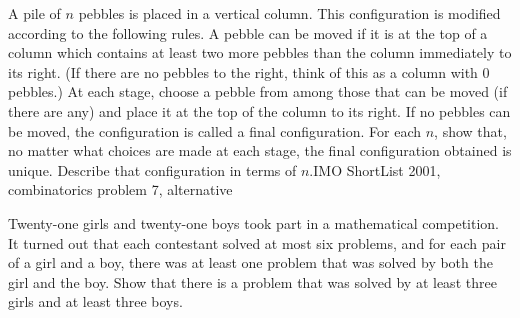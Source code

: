 \item[\textbf{C7.}]A pile of $n$ pebbles is placed in a vertical column. This configuration is modified according to the following rules. A pebble can be moved if it is at the top of a column which contains at least two more pebbles than the column immediately to its right. (If there are no pebbles to the right, think of this as a column with 0 pebbles.) At each stage, choose a pebble from among those that can be moved (if there are any) and place it at the top of the column to its right. If no pebbles can be moved, the configuration is called a final configuration. For each $n$,  show that, no matter what choices are made at each stage, the final configuration obtained is unique. Describe that configuration in terms of $n$.IMO ShortList 2001, combinatorics problem 7, alternative

\item[\textbf{C8.}]Twenty-one girls and twenty-one boys took part in a mathematical competition. It turned out that each contestant solved at most six problems, and for each pair of a girl and a boy, there was at least one problem that was solved by both the girl and the boy. Show that there is a problem that was solved by at least three girls and at least three boys.